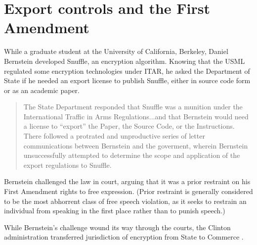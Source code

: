 \documentclass[12pt]{olfmemo}
\begin{document}
\section{Export controls and the First Amendment}
While a graduate student at the University of California, Berkeley, Daniel Bernstein developed Snuffle, an encryption algorithm. Knowing that the USML regulated some encryption technologies under ITAR, he asked the Department of State if he needed an export license to publish Snuffle, either in source code form or as an academic paper.
\begin{quote}
The State Department responded that Snuffle was a munition under the International Traffic in Arms Regulations...and that Bernstein would need a license to ``export'' the Paper, the Source Code,
or the Instructions. There followed a protrated and unproductive series of letter communications between Bernstein and the goverment, wherein Bernstein unsuccessfully attempted to determine the scope and application of the export regulations to Snuffle. \citep{Bernstein1997}
\end{quote}
%
Bernstein challenged the law in court, arguing that it was a prior restraint on his First Amendment rights to free expression.\citep{Bernstein1997} (Prior restraint is generally considered to be the most abhorrent class of free speech violation, as it seeks to restrain an individual from speaking in the first place rather than to punish speech.)

While Bernstein's challenge wound its way through the courts, the Clinton administration transferred jurisdiction of encryption from State to Commerce \citep{ExecOrder13026_1996}.

%







\end{document}
